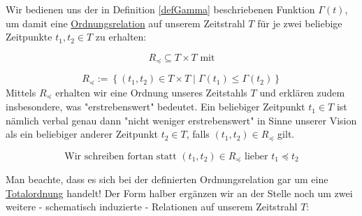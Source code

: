 \begin{Def}\label{defRelation}

Wir bedienen uns der in Definition \ref{defGamma} beschriebenen Funktion $\Gamma(t)$, um damit eine \href{https://de.wikipedia.org/wiki/Ordnungsrelation}{Ordnungsrelation} 
auf unserem Zeitstrahl $T$ für je zwei beliebige Zeitpunkte $t_1, t_2 \in T$ zu erhalten: 

\vspace{0.3cm}

\begin{equation*}
  R_{\preceq} \subseteq T \times T \textrm{ mit}
\end{equation*}

\begin{equation*}
  R_{\preceq}:= \left\{ (t_1, t_2) \in T \times T \mid \Gamma(t_1) \leq \Gamma(t_2) \right\}
\end{equation*}
\vspace{1cm}
Mittels $R_{\preceq}$ erhalten wir eine Ordnung unseres Zeitstahls $T$ und erklären zudem insbesondere, was "erstrebenswert" bedeutet. Ein beliebiger Zeitpunkt $t_1 \in T$ ist nämlich verbal genau dann "nicht weniger erstrebenswert" in Sinne unserer Vision als ein beliebiger anderer Zeitpunkt $t_2 \in T$, falls $(t_1, t_2) \in R_{\preceq}$ gilt.

\vspace{0.3cm}

\begin{equation*}
  \textrm{Wir schreiben fortan statt } (t_1, t_2) \in R_{\preceq} \textrm{ lieber } t_1 \preceq t_2 
\end{equation*}

\end{Def}

\vspace{1cm}

Man beachte, dass es sich bei der definierten Ordnungsrelation gar um eine \href{https://de.wikipedia.org/wiki/Ordnungsrelation#Totalordnung}{Totalordnung} handelt!
Der Form halber ergänzen wir an der Stelle noch um zwei weitere - schematisch induzierte - Relationen auf unserem Zeitstrahl $T$:

\vspace{0.3cm}

